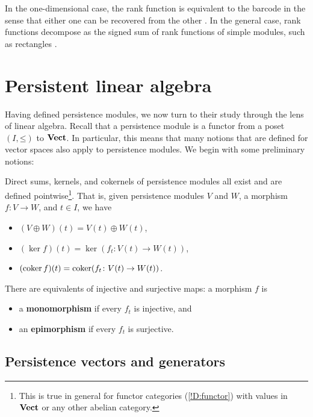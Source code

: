 In the one-dimensional case, the rank function is equivalent to the barcode in the sense that either one can be recovered from the other \cite{CarlssonZomorodian2009}. In the general case, rank functions decompose as the signed sum of rank functions of simple modules, such as rectangles \cite{BOO2025}.


\section{Persistent linear algebra}
\label{S:persistent-linear-algebra}

Having defined persistence modules, we now turn to their study through the lens of linear algebra. Recall that a persistence module is a functor from a poset $(I, \mathord{\leq})$ to $\operatorname{\mathbf{Vect}}$. In particular, this means that many notions that are defined for vector spaces also apply to persistence modules. We begin with some preliminary notions:

\begin{definition}
\label{!D:pointwise-defs}
  Direct sums, kernels, and cokernels of persistence modules all exist and are defined pointwise\footnote{This is true in general for functor categories (\cref{!D:functor}) with values in $\operatorname{\mathbf{Vect}}$ or any other abelian category.}. That is, given persistence modules $V$ and $W$, a morphism $f \colon V \to W$, and $t \in I$, we have
  \begin{itemize}
    \item $(V \oplus W)(t) = V(t) \oplus W(t)$,
    \item $(\ker f)(t) = \ker (f_t \colon V(t) \to W(t))$,
    \item $(\operatorname{coker} f)(t) = \operatorname{coker} (f_t \colon V(t) \to W(t))$.
  \end{itemize}
  There are equivalents of injective and surjective maps: a morphism $f$ is
  \begin{itemize}
    \item a \textbf{monomorphism} if every $f_t$ is injective, and
    \item an \textbf{epimorphism} if every $f_t$ is surjective. \qedhere
  \end{itemize}
\end{definition}

\subsection{Persistence vectors and generators}

